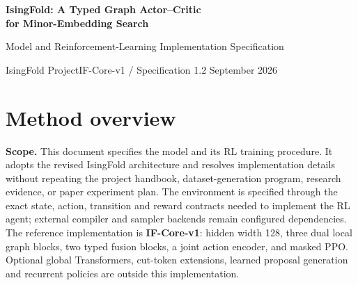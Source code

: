 \documentclass[10pt,a4paper]{article}
\begin{document}
\thispagestyle{plain}
\begin{center}
{\LARGE\bfseries IsingFold: A Typed Graph Actor--Critic\\[3pt]for Minor-Embedding Search\par}
\vspace{6pt}
{\large Model and Reinforcement-Learning Implementation Specification\par}
\vspace{5pt}
{\small IsingFold Project\quad\textbar\quad IF-Core-v1 / Specification 1.2\quad\textbar{} September 2026\par}
\end{center}
\vspace{1pt}
\begin{abstract}
\noindent We specify IF-Core, a graph actor--critic that selects fully
materialized minor-embedding rewrites under an exact action mask. The
model combines separate logical and hardware message passing, typed
ownership/conflict fusion, and phase-aware encoders for joint chain
replacements, routes, and valid incumbents. A categorical actor chooses
a macro-action; a utility critic estimates terminal decoded solve
probability, while a failure critic is enabled for construction tasks. A
separate frozen program predictor selects chain strength without access
to the ground-state energy. Learning uses complete-episode rollouts,
generalized advantage estimation, and masked proximal policy
optimization with explicit gradient and probability-replay contracts.
This document fixes feature dimensions, every major forward operation,
exact search/return predicates, action preconditions, transitions,
terminal semantics, training losses, rollout storage, and deployment
behavior. It is a model specification, not a report of trained
performance.
\end{abstract}
\vspace{3pt}
\hypertarget{method-overview}{%
\section{Method overview}\label{method-overview}}

\textbf{Scope.} This document specifies the model and its RL training
procedure. It adopts the revised IsingFold architecture and resolves
implementation details without repeating the project handbook,
dataset-generation program, research evidence, or paper experiment plan.
The environment is specified through the exact state, action, transition
and reward contracts needed to implement the RL agent; external compiler
and sampler backends remain configured dependencies. The reference
implementation is \textbf{IF-Core-v1}: hidden width 128, three dual
local graph blocks, two typed fusion blocks, a joint action encoder, and
masked PPO. Optional global Transformers, cut-token extensions, learned
proposal generation and recurrent policies are outside this
implementation.
\end{document}

